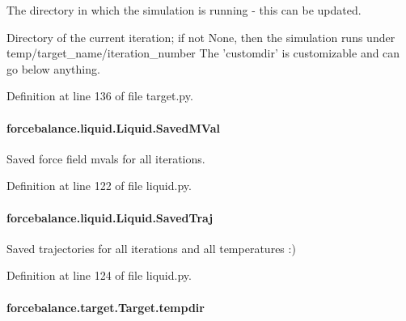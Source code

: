 The directory in which the simulation is running -\/ this can be updated. 

Directory of the current iteration; if not None, then the simulation runs under temp/target\-\_\-name/iteration\-\_\-number The 'customdir' is customizable and can go below anything.

Definition at line 136 of file target.\-py.

\hypertarget{classforcebalance_1_1liquid_1_1Liquid_a5b9df1bf79a641156429e292f47b6afd}{
\paragraph[{Saved\-M\-Val}]{\setlength{\rightskip}{0pt plus 5cm}forcebalance.\-liquid.\-Liquid.\-Saved\-M\-Val}}\label{classforcebalance_1_1liquid_1_1Liquid_a5b9df1bf79a641156429e292f47b6afd}


Saved force field mvals for all iterations. 



Definition at line 122 of file liquid.\-py.

\hypertarget{classforcebalance_1_1liquid_1_1Liquid_a0da0c00cdc193c9c470d7e528043fb99}{
\paragraph[{Saved\-Traj}]{\setlength{\rightskip}{0pt plus 5cm}forcebalance.\-liquid.\-Liquid.\-Saved\-Traj}}\label{classforcebalance_1_1liquid_1_1Liquid_a0da0c00cdc193c9c470d7e528043fb99}


Saved trajectories for all iterations and all temperatures \-:) 



Definition at line 124 of file liquid.\-py.

\hypertarget{classforcebalance_1_1target_1_1Target_aa1f01b5b78db253b5b66384ed11ed193}{
\paragraph[{tempdir}]{\setlength{\rightskip}{0pt plus 5cm}forcebalance.\-target.\-Target.\-tempdir\hspace{0.3cm}{\ttfamily [inherited]}}}\label{classforcebalance_1_1target_1_1Target_aa1f01b5b78db253b5b66384ed11ed193}


